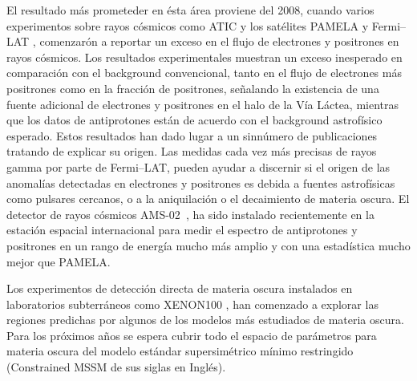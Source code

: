 El resultado más prometeder en ésta área proviene del 2008, cuando
varios experimentos sobre rayos cósmicos como ATIC \cite{:2008zzr} y
los satélites PAMELA \cite{Adriani:2008zr} y Fermi--LAT
\cite{Abdo:2009zk}, comenzarón a reportar un exceso en el flujo de
electrones y positrones en rayos cósmicos.
%
Los resultados experimentales muestran un exceso
inesperado en comparación con el background convencional, tanto en el
flujo de electrones más positrones como en la fracción de positrones,
señalando la existencia de una fuente adicional de electrones y
positrones en el halo de la Vía Láctea, mientras que los datos de
antiprotones están de acuerdo con el background astrofísico esperado. 
%
Estos resultados han dado lugar a un sinnúmero de publicaciones
tratando de explicar su origen. Las medidas cada vez más precisas de
rayos gamma por parte de Fermi--LAT, pueden ayudar a discernir si el
origen de las anomalías detectadas en electrones y positrones es
debida a fuentes astrofísicas como pulsares cercanos, o a la
aniquilación o el decaimiento de materia oscura.
%
El detector de rayos cósmicos AMS-02~\cite{ams:2009}, ha sido
instalado recientemente en la estación espacial internacional para
medir el espectro de antiprotones y positrones en un rango de energía
mucho más amplio y con una estadística mucho mejor que PAMELA.

Los experimentos de detección directa de materia oscura instalados en
laboratorios subterráneos como XENON100 \cite{Aprile:2011ts}, han
comenzado a explorar las regiones predichas por algunos de los modelos
más estudiados de materia oscura. Para los próximos años se espera
cubrir todo el espacio de parámetros para materia oscura del modelo
estándar supersimétrico mínimo restringido (Constrained MSSM de sus
siglas en Inglés).  


